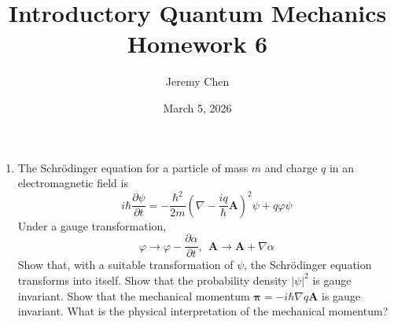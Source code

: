 \documentclass[10pt,letterpaper]{article}
\title{Introductory Quantum Mechanics Homework 6}
\author{Jeremy Chen}
\date{March 5, 2026}
\begin{document}
	\maketitle
	
\begin{enumerate}

\item The Schrödinger equation for a particle of mass $m$ and charge $q$ in an electromagnetic field is
$$i\hbar \frac{\partial \psi}{\partial t} = -\frac{\hbar^{2}}{2m}\left( \nabla - \frac{iq}{\hbar}\textbf{A} \right)^{2} \psi + q\varphi\psi$$
Under a gauge transformation,
$$\varphi \rightarrow \varphi - \frac{\partial \alpha}{\partial t},\ \ \textbf{A} \rightarrow \textbf{A} + \nabla \alpha$$
Show that, with a suitable transformation of $\psi$, the Schrödinger equation transforms into itself. Show that the probability density $|\psi|^{2}$ is gauge invariant. Show that the mechanical momentum $\boldsymbol{\pi} = -i\hbar\nabla q\textbf{A}$ is gauge invariant. What is the physical interpretation of the mechanical momentum?


\end{enumerate}
\end{document}

